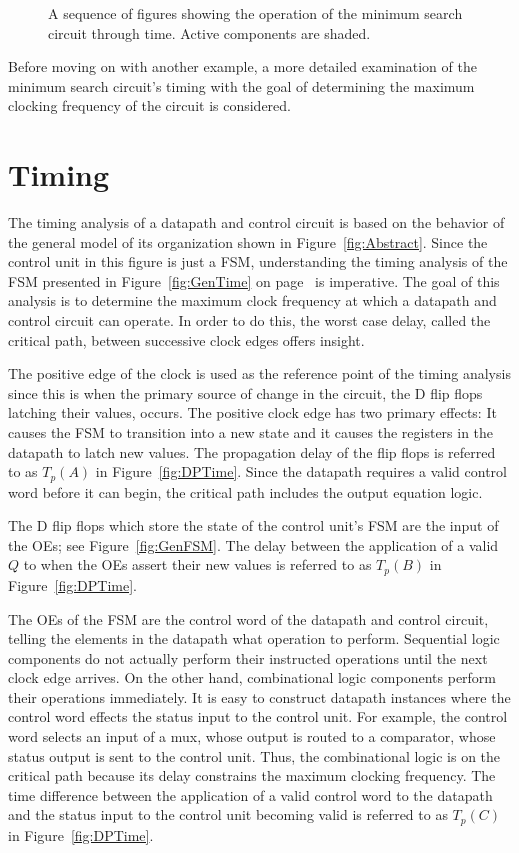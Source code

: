\begin{figure}
\caption{A sequence of figures showing the operation of 
the minimum search circuit through time.  Active components 
are shaded.}
\label{fig:mintable}
\end{figure}

Before moving on with another example, a more
detailed examination of the minimum search circuit's timing
with the goal of determining the maximum clocking frequency
of the circuit is considered.


\section{Timing}
The timing analysis of a datapath and control circuit is
based on the behavior of the general model of its organization
shown in Figure~\ref{fig:Abstract}.  Since the control unit in
this figure is just a FSM, understanding
the timing analysis of the FSM presented in 
Figure~\ref{fig:GenTime} on page~\pageref{page:GenTime} is imperative.  The goal 
of this analysis is to determine the maximum clock frequency at which
a datapath and control circuit can operate. In order to do 
this, the worst case delay, called the 
critical path, between successive clock edges offers insight.

The positive edge of the clock is used as the reference point
of the timing analysis since this is when the primary source of change
in the circuit, the D flip flops latching their values, occurs.
The positive clock edge has two primary effects: It causes the 
FSM to transition into a new state and it causes the registers in
the datapath to latch new values.  The propagation delay of the
flip flops is referred to as $T_p(A)$ in Figure~\ref{fig:DPTime}.  Since
the datapath requires a valid control word before it can begin, 
the critical path includes the output equation logic. 

The D flip flops which store the state of the control unit's FSM
are the input of the OEs; see Figure~\ref{fig:GenFSM}.  The delay
between the application of a valid $Q$ to when the OEs assert their new
values is referred to as $T_p(B)$ in Figure~\ref{fig:DPTime}.

The OEs of the FSM are the control word of the datapath and
control circuit, telling the elements in the datapath what operation
to perform.  Sequential logic components do not actually
perform their instructed operations until the next clock edge
arrives.  On the other hand, combinational logic components 
perform their operations immediately.  It is easy to construct
datapath instances where the control word effects the status
input to the control unit.  For example, the control word
selects an input of a mux, whose output is routed to a comparator,
whose status output is sent to the control unit.  Thus, the 
combinational logic is on the critical path because its delay 
constrains the maximum clocking frequency.  The time difference 
between the application of a valid control word to the datapath
and the status input to the control unit becoming valid is referred 
to as $T_p(C)$ in Figure~\ref{fig:DPTime}.

